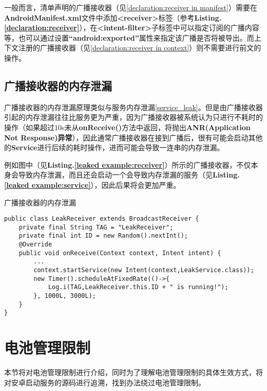一般而言，清单声明的广播接收器（见\ref{declaration:receiver in manifest}）需要在\textbf{AndroidManifest.xml}文件中添加\textbf{<receiver>}标签（参考\textbf{Listing.\textcolor{red}{\ref{declaration:receiver}}}），在\textbf{<intent-filter>}子标签中可以指定订阅的广播内容等，也可以通过设置\textbf{“android:exported”}属性来指定该广播是否将被导出。而上下文注册的广播接收器（见\ref{declaration:receiver in context}）则不需要进行前文的操作。
\subsection{广播接收器的内存泄漏}
广播接收器的内存泄漏原理类似与服务内存泄漏\ref{service_leak}。但是由广播接收器引起的内存泄漏往往比服务更为严重，因为广播接收器被系统认为只进行不耗时的操作（如果超过10s未从\textbf{onReceive()}方法中返回，将抛出\textbf{ANR(Application Not Response)异常}），因此通常广播接收器在接到广播后，很有可能会启动其他的\textbf{Service}进行后续的耗时操作，进而可能会导致一连串的内存泄漏。

例如图中（见\textbf{Listing.\textcolor{red}{\ref{leaked example:receiver}}}）所示的广播接收器，不仅本身会导致内存泄漏，而且还会启动一个会导致内存泄漏的服务（见\textbf{Listing.\textcolor{red}{\ref{leaked example:service}}}），因此后果将会更加严重。
\begin{listing}[htbp]
	\centering
	\caption{广播接收器的内存泄漏}
	\begin{verbatim}
public class LeakReceiver extends BroadcastReceiver {
	private final String TAG = "LeakReceiver";
	private final int ID = new Random().nextInt();
	@Override
	public void onReceive(Context context, Intent intent) {
		...
		context.startService(new Intent(context,LeakService.class));
		new Timer().scheduleAtFixedRate(()->{
			Log.i(TAG,LeakReceiver.this.ID + " is running!");
		}, 1000L, 3000L);
	}
}
	\end{verbatim}
	\label{leaked example:receiver}
\end{listing}

\section{电池管理限制}

本节将对电池管理限制进行介绍，同时为了理解电池管理限制的具体生效方式，将对安卓启动服务的源码进行追溯，找到办法绕过电池管理限制。

